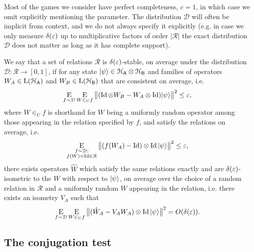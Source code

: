 Most of the games we consider have perfect completeness, $c=1$, in which case we  omit explicitly mentioning the parameter. 
 The distribution $\mathcal{D}$ will often be implicit from context, and we do not always specify it explicitly (e.g. in case we only measure $\delta(\varepsilon)$ up to multiplicative factors of order $|\mathcal{R}|$ the exact distribution $\mathcal{D}$ does not matter as long as it has complete support). 

\begin{definition}
We say that a set of relations $\mathcal{R}$ is $\delta(\varepsilon)$-stable, on average under the distribution $\mathcal{D}:\mathcal{R}\to[0,1]$, if for any state $|\psi\rangle\in\mathcal{H}_{\textsf{A}}\otimes \mathcal{H}_{\textsf{B}}$ and families of operators $W_A\in\mathrm{L}(\mathcal{H}_{\textsf{A}})$ and  $W_B\in\mathrm{L}(\mathcal{H}_{\textsf{B}})$ that are consistent on average, i.e. 
$$\mathop{\textsc{E}}_{f \sim\mathcal{D}} \mathop{\textsc{E}}_{W \in_U f} \big\| (\mathop{\rm Id}\nolimits\otimes W_B - W_A \otimes \mathop{\rm Id}\nolimits)|\psi\rangle\big\|^2\leq \varepsilon,$$
where $W \in_U f$ is shorthand for $W$ being a uniformly random operator among those appearing in the relation specified by $f$,
and satisfy the relations on average, i.e. 
$$\mathop{\textsc{E}}_{\substack{f\sim\mathcal{D}:\\f(W)=\mathop{\rm Id}\nolimits \in\mathcal{R}}} \big\|  (f(W_A)- \mathop{\rm Id}\nolimits) \otimes \mathop{\rm Id}\nolimits |\psi\rangle\big\|^2 \leq \varepsilon,$$
  there exists operators $\hat{W}$ which satisfy the same relations exactly and are $\delta(\varepsilon)$-isometric to the $W$ with respect to $|\psi\rangle$, on average over the choice of a random relation in $\mathcal{R}$ and a uniformly random $W$ appearing in the relation, i.e. there exists an isometry $V_A$ such that 
  \begin{equation}
    \mathop{\textsc{E}}_{f \sim\mathcal{D}} \mathop{\textsc{E}}_{W \in_U f} \big\|( \hat{W}_A-V_A W_A)\otimes \mathop{\rm Id}\nolimits |\psi\rangle\big\|^2=O(\delta(\varepsilon)).\nonumber
  \end{equation}
	\end{definition}


\subsection{The conjugation test}
\label{sec:conj-test}

